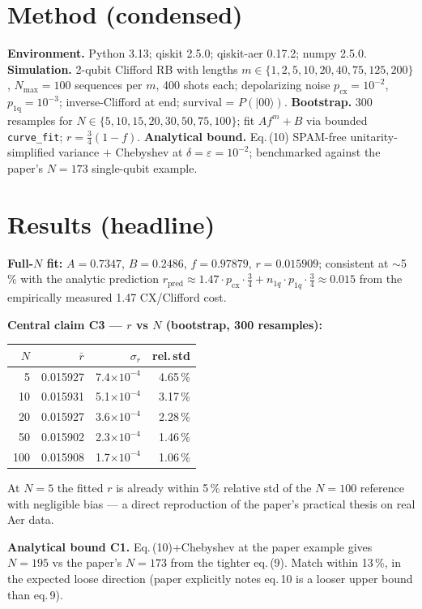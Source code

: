 \documentclass[11pt]{article}
\begin{document}
\section{Method (condensed)}
\textbf{Environment.} Python 3.13; qiskit 2.5.0; qiskit-aer 0.17.2; numpy 2.5.0.
\textbf{Simulation.} 2-qubit Clifford RB with lengths $m\in\{1,2,5,10,20,40,75,125,200\}$,
$N_{\max}=100$ sequences per $m$, 400 shots each; depolarizing noise
$p_\mathrm{cx}=10^{-2}$, $p_\mathrm{1q}=10^{-3}$; inverse-Clifford at end;
survival = $P(|00\rangle)$.
\textbf{Bootstrap.} 300 resamples for
$N\in\{5,10,15,20,30,50,75,100\}$; fit $A f^m + B$ via bounded
\texttt{curve\_fit}; $r = \tfrac{3}{4}(1-f)$.
\textbf{Analytical bound.} Eq.\,(10) SPAM-free unitarity-simplified variance
$+ $ Chebyshev at $\delta=\varepsilon=10^{-2}$; benchmarked against the paper's
$N=173$ single-qubit example.

\section{Results (headline)}
\textbf{Full-$N$ fit:} $A=0.7347$, $B=0.2486$, $f=0.97879$,
$r=\mathbf{0.015909}$; consistent at $\sim$5\,\% with the analytic prediction
$r_\mathrm{pred}\approx 1.47\!\cdot\!p_\mathrm{cx}\!\cdot\!\tfrac{3}{4} + n_{1q}\!\cdot\!p_{1q}\!\cdot\!\tfrac{3}{4} \approx 0.015$
from the empirically measured 1.47 CX/Clifford cost.

\textbf{Central claim C3 --- $r$ vs $N$ (bootstrap, 300 resamples):}
\begin{center}
\begin{tabular}{rrrr}
\toprule
$N$ & $\bar r$ & $\sigma_r$ & rel.\,std \\
\midrule
5 & 0.015927 & 7.4$\times10^{-4}$ & 4.65\,\% \\
10 & 0.015931 & 5.1$\times10^{-4}$ & 3.17\,\% \\
20 & 0.015927 & 3.6$\times10^{-4}$ & 2.28\,\% \\
50 & 0.015902 & 2.3$\times10^{-4}$ & 1.46\,\% \\
100 & 0.015908 & 1.7$\times10^{-4}$ & 1.06\,\% \\
\bottomrule
\end{tabular}
\end{center}

At $N=5$ the fitted $r$ is already within 5\,\% relative std of the $N=100$
reference with negligible bias --- a direct reproduction of the paper's
practical thesis on real Aer data.

\textbf{Analytical bound C1.} Eq.\,(10)+Chebyshev at the paper example gives
$N=195$ vs the paper's $N=173$ from the tighter eq.\,(9). Match within 13\,\%,
in the expected loose direction (paper explicitly notes eq.\,10 is a looser
upper bound than eq.\,9).
\end{document}
